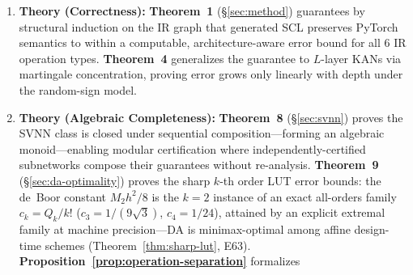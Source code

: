 \documentclass[journal,onecolumn]{IEEEtran}
\begin{document}
\begin{enumerate}
         conjecture).
         Condition~3 yields a depth-improving
          \textbf{generalization bound} $\Delta_{\text{gen}} \leq O(\gamma^L/\sqrt{n})$
          (Theorem~6, {\S}\ref{sec:svnn-generalization}). The framework is
         extended to \textbf{ChebyKAN} (Chebyshev polynomial KANs):
          496/512 Z3-verifiable via polynomial NRA, 100.0\%
         CWRU accuracy (Proposition~\ref{prop:chebykan-svnn}).
          \textbf{E56} (3-layer KAN: 608/608 Z3, 99.60\% acc)
         and \textbf{E57} (NeuroPLC DA substantially tighter than
         CROWN-IBP, which reduces to IBP for KAN)
         provide empirical depth-scaling and verifier-comparison evidence.
          \textbf{DA segment-exactness} (Proposition~\ref{prop:da-segment-exactness},
          {\S}\ref{sec:da-segment-exactness}) proves
         Doubleton Arithmetic achieves segment-exactness on affine B-spline
         segments, explaining the mechanism behind DA's tightening over IA.
          \textbf{Theorem~7} establishes the sufficient condition for Z3 NRA
         verifiability ($M_2 \cdot h^2 / 8 \leq C(k)$), providing the
         theoretical basis for the B-spline 512/512 and Chebyshev 496/512
         verification rates.
    \item \textbf{Theory (Correctness):} \textbf{Theorem~1}
          ({\S}\ref{sec:method}) guarantees by structural induction on the IR
         graph that generated SCL preserves PyTorch semantics to within a
         computable, architecture-aware error bound for all 6 IR operation
         types. \textbf{Theorem~4} generalizes the guarantee to $L$-layer
         KANs via martingale concentration, proving error grows only linearly
         with depth under the random-sign model.
    \item \textbf{Theory (Algebraic Completeness):} \textbf{Theorem~8}
          ({\S}\ref{sec:svnn}) proves the SVNN class is closed under
         sequential composition---forming an algebraic monoid---enabling
         modular certification where independently-certified subnetworks
         compose their guarantees without re-analysis.
          \textbf{Theorem~9} ({\S}\ref{sec:da-optimality}) proves the
         sharp $k$-th order LUT error bounds: the de~Boor constant
         $M_2h^2/8$ is the $k=2$ instance of an exact all-orders family
         $c_k = Q_k/k!$ ($c_3 = 1/(9\sqrt{3})$, $c_4 = 1/24$), attained
         by an explicit extremal family at machine precision---DA is
         minimax-optimal among affine design-time schemes
         (Theorem~\ref{thm:sharp-lut}, E63).
          \textbf{Proposition~\ref{prop:operation-separation}} formalizes

\end{enumerate}
\end{document}
